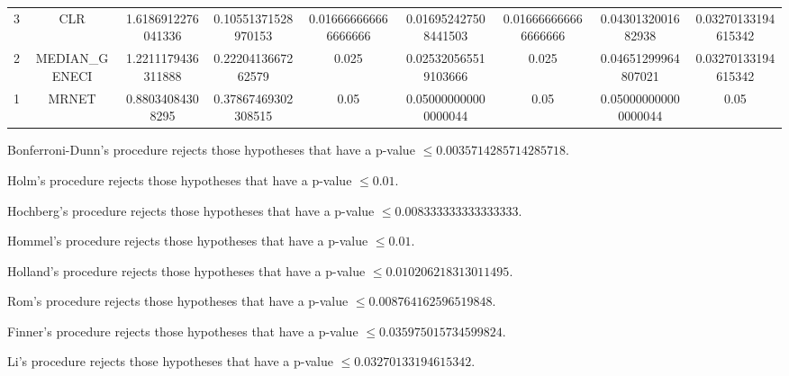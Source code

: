 \documentclass[a4paper,10pt]{article}
\begin{document}
\begin{landscape}
\begin{table}[!htp]
\begin{tabular}{ccccccccc}
3&CLR&1.6186912276041336&0.10551371528970153&0.016666666666666666&0.016952427508441503&0.016666666666666666&0.0430132001682938&0.03270133194615342\\
2&MEDIAN_GENECI&1.2211179436311888&0.2220413667262579&0.025&0.025320565519103666&0.025&0.04651299964807021&0.03270133194615342\\
1&MRNET&0.88034084308295&0.37867469302308515&0.05&0.050000000000000044&0.05&0.050000000000000044&0.05\\
\hline
\end{tabular}
\end{table}
Bonferroni-Dunn's procedure rejects those hypotheses that have a p-value $\le0.0035714285714285718$.


Holm's procedure rejects those hypotheses that have a p-value $\le0.01$.


Hochberg's procedure rejects those hypotheses that have a p-value $\le0.008333333333333333$.


Hommel's procedure rejects those hypotheses that have a p-value $\le0.01$.


Holland's procedure rejects those hypotheses that have a p-value $\le0.010206218313011495$.


Rom's procedure rejects those hypotheses that have a p-value $\le0.008764162596519848$.


Finner's procedure rejects those hypotheses that have a p-value $\le0.035975015734599824$.


Li's procedure rejects those hypotheses that have a p-value $\le0.03270133194615342$.



\newpage


\end{landscape}
\end{document}
